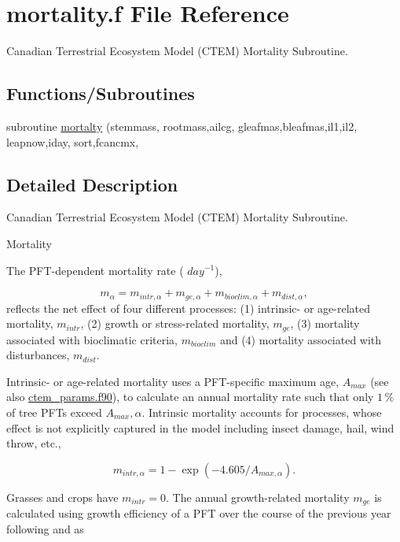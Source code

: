 \hypertarget{mortality_8f}{}\section{mortality.\+f File Reference}
\label{mortality_8f}


Canadian Terrestrial Ecosystem Model (C\+T\+E\+M) Mortality Subroutine.  


\subsection*{Functions/\+Subroutines}
\begin{DoxyCompactItemize}
\item 
subroutine \hyperlink{mortality_8f_a11a826efba70183880f4f963e93c4247}{mortalty} (stemmass, rootmass,ailcg, gleafmas,bleafmas,il1,il2, leapnow,iday, sort,fcancmx,
\end{DoxyCompactItemize}


\subsection{Detailed Description}
Canadian Terrestrial Ecosystem Model (C\+T\+E\+M) Mortality Subroutine. 

Mortality

The P\+F\+T-\/dependent mortality rate ( $day^{-1}$),

\[ \label{mortality} m_{\alpha} = m_{intr,\alpha} + m_{ge,\alpha} + m_{bioclim,\alpha} + m_{dist,\alpha}, \] reflects the net effect of four different processes\+: (1) intrinsic-\/ or age-\/related mortality, $m_{intr}$, (2) growth or stress-\/related mortality, $m_{ge}$, (3) mortality associated with bioclimatic criteria, $m_{bioclim}$ and (4) mortality associated with disturbances, $m_{dist}$.

Intrinsic-\/ or age-\/related mortality uses a P\+F\+T-\/specific maximum age, $A_{max}$ (see also \hyperlink{ctem__params_8f90}{ctem\+\_\+params.\+f90}), to calculate an annual mortality rate such that only $1\,{\%}$ of tree P\+F\+Ts exceed $A_{max},\alpha$. Intrinsic mortality accounts for processes, whose effect is not explicitly captured in the model including insect damage, hail, wind throw, etc.,

\[ \label{intrmort} m_{intr,\alpha} = 1 - \exp(-4.605/A_{max,\alpha}). \]

Grasses and crops have $m_{intr} = 0$. The annual growth-\/related mortality $m_{ge}$ is calculated using growth efficiency of a P\+F\+T over the course of the previous year following \cite{Prentice1993-xn} and \cite{Sitch2003-847} as

